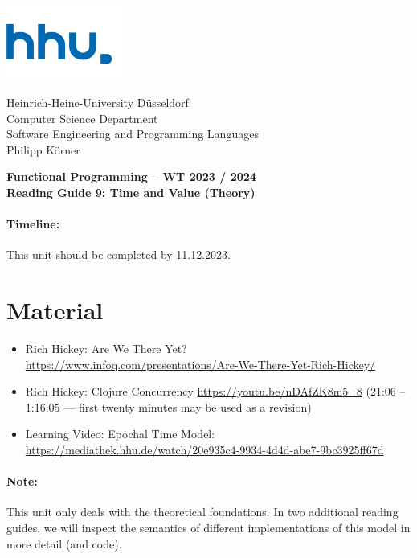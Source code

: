 \documentclass[11pt,a4paper]{article}
\begin{document}
	
\begin{minipage}[b]{\textwidth}
	\parbox[t]{5cm}{%
		\includegraphics[width=4cm]{unilogo}
		\hfill
	}
	\parbox[b]{11cm}{%
		Heinrich-Heine-University D\"usseldorf\\
		Computer Science Department\\
		Software Engineering and Programming Languages\\
		Philipp K\"orner
	}
\end{minipage}
\begin{center}
	\bf
	Functional Programming -- WT 2023 / 2024\\
	Reading Guide 9: Time and Value (Theory)
\end{center}

\pagestyle{empty}

\paragraph{Timeline:} This unit should be completed by 11.12.2023.

\section{Material} 

\begin{itemize}
\item Rich Hickey: Are We There Yet? \\ \url{https://www.infoq.com/presentations/Are-We-There-Yet-Rich-Hickey/}
\item Rich Hickey: Clojure Concurrency \url{https://youtu.be/nDAfZK8m5_8} (21:06 -- 1:16:05 --- first twenty minutes may be used as a revision)
\item Learning Video: Epochal Time Model: \url{https://mediathek.hhu.de/watch/20e935c4-9934-4d4d-abe7-9bc3925ff67d}
\end{itemize}

\paragraph{Note:} This unit only deals with the theoretical foundations.
In two additional reading guides, we will inspect the semantics of different implementations of this model
in more detail (and code).
\end{document}
